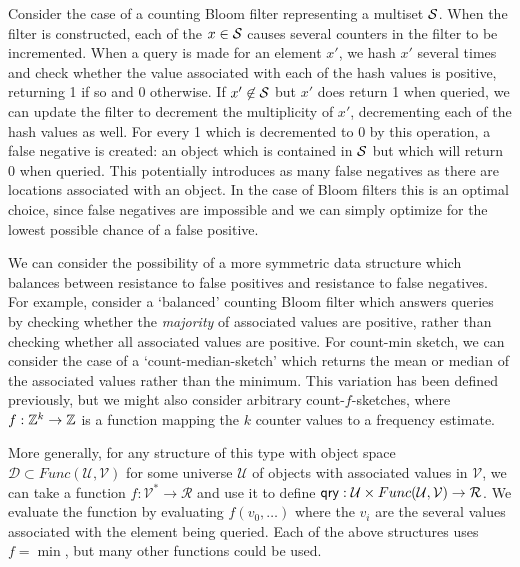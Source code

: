 Consider the case of a counting Bloom filter representing a multiset $\mathcal{S}$. When the filter is constructed, each of the $x \in \mathcal{S}$ causes several counters in the filter to be incremented. When a query is made for an element $x'$, we hash $x'$ several times and check whether the value associated with each of the hash values is positive, returning 1 if so and 0 otherwise. If $x' \not\in \mathcal{S}$ but $x'$ does return 1 when queried, we can update the filter to decrement the multiplicity of $x'$, decrementing each of the hash values as well. For every 1 which is decremented to 0 by this operation, a false negative is created: an object which is contained in $\mathcal{S}$ but which will return 0 when queried. This potentially introduces as many false negatives as there are locations associated with an object. In the case of Bloom filters this is an optimal choice, since false negatives are impossible and we can simply optimize for the lowest possible chance of a false positive.

We can consider the possibility of a more symmetric data structure which balances between resistance to false positives and resistance to false negatives. For example, consider a `balanced' counting Bloom filter which answers queries by checking whether the \emph{majority} of associated values are positive, rather than checking whether all associated values are positive. For count-min sketch, we can consider the case of a `count-median-sketch' which returns the mean or median of the associated values rather than the minimum. This variation has been defined previously, but we might also consider arbitrary count-$f$-sketches, where $f: \mathbb{Z}^k \to \mathbb{Z}$ is a function mapping the $k$ counter values to a frequency estimate.

More generally, for any structure of this type with object space $\mathcal{D} \subset Func(\mathcal{U},\mathcal{V})$ for some universe $\mathcal{U}$ of objects with associated values in $\mathcal{V}$, we can take a function $f: \mathcal{V}^* \to \mathcal{R}$ and use it to define $\mathsf{qry}: \mathcal{U} \times Func(\mathcal{U},\mathcal{V}) \to \mathcal{R}$. We evaluate the function by evaluating $f(v_0,\ldots)$ where the $v_i$ are the several values associated with the element being queried. Each of the above structures uses $f = \min$, but many other functions could be used.

